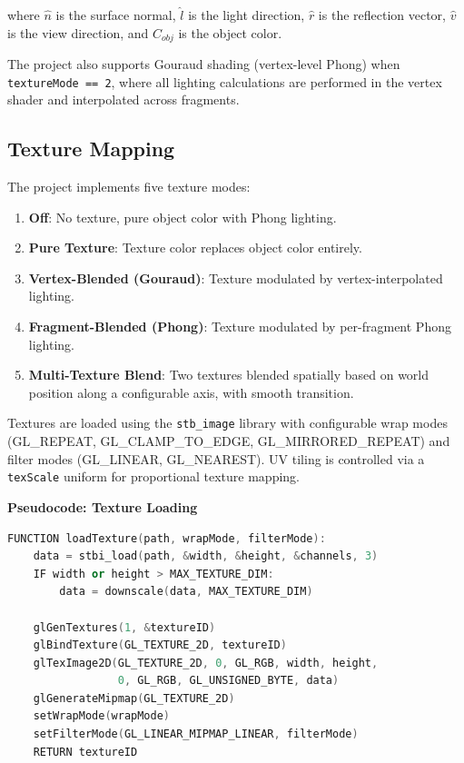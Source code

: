 \documentclass[12pt,a4paper]{article}
\begin{document}
where $\hat{n}$ is the surface normal, $\hat{l}$ is the light direction, $\hat{r}$ is the reflection vector, $\hat{v}$ is the view direction, and $C_{obj}$ is the object color.

The project also supports Gouraud shading (vertex-level Phong) when \texttt{textureMode == 2}, where all lighting calculations are performed in the vertex shader and interpolated across fragments.

\subsection{Texture Mapping}

The project implements five texture modes:
\begin{enumerate}[start=0]
    \item \textbf{Off}: No texture, pure object color with Phong lighting.
    \item \textbf{Pure Texture}: Texture color replaces object color entirely.
    \item \textbf{Vertex-Blended (Gouraud)}: Texture modulated by vertex-interpolated lighting.
    \item \textbf{Fragment-Blended (Phong)}: Texture modulated by per-fragment Phong lighting.
    \item \textbf{Multi-Texture Blend}: Two textures blended spatially based on world position along a configurable axis, with smooth transition.
\end{enumerate}

Textures are loaded using the \texttt{stb\_image} library with configurable wrap modes (GL\_REPEAT, GL\_CLAMP\_TO\_EDGE, GL\_MIRRORED\_REPEAT) and filter modes (GL\_LINEAR, GL\_NEAREST). UV tiling is controlled via a \texttt{texScale} uniform for proportional texture mapping.

\textbf{Pseudocode: Texture Loading}
\begin{lstlisting}[language=C++, caption={Texture Loading}]
FUNCTION loadTexture(path, wrapMode, filterMode):
    data = stbi_load(path, &width, &height, &channels, 3)
    IF width or height > MAX_TEXTURE_DIM:
        data = downscale(data, MAX_TEXTURE_DIM)

    glGenTextures(1, &textureID)
    glBindTexture(GL_TEXTURE_2D, textureID)
    glTexImage2D(GL_TEXTURE_2D, 0, GL_RGB, width, height,
                 0, GL_RGB, GL_UNSIGNED_BYTE, data)
    glGenerateMipmap(GL_TEXTURE_2D)
    setWrapMode(wrapMode)
    setFilterMode(GL_LINEAR_MIPMAP_LINEAR, filterMode)
    RETURN textureID
\end{lstlisting}
\end{document}
